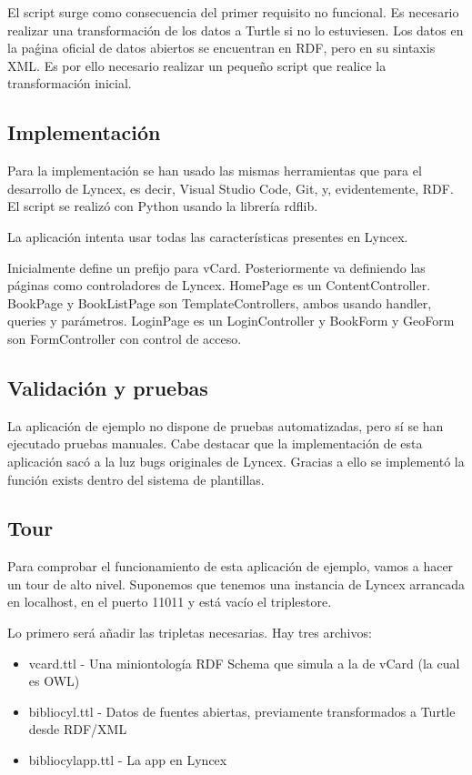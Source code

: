 \documentclass[12pt]{report} %
\begin{document}
El script surge como consecuencia del primer requisito no funcional. Es necesario realizar una transformación de los datos a Turtle si no lo estuviesen. Los datos en la paǵina oficial de datos abiertos se encuentran en RDF, pero en su sintaxis XML. Es por ello necesario realizar un pequeño script que realice la transformación inicial.


\subsection{Implementación}

Para la implementación se han usado las mismas herramientas que para el desarrollo de Lyncex, es decir, Visual Studio Code, Git, y, evidentemente, RDF. El script se realizó con Python usando la librería rdflib.

La aplicación intenta usar todas las características presentes en Lyncex. 

Inicialmente define un prefijo para vCard. Posteriormente va definiendo las páginas como controladores de Lyncex. HomePage es un ContentController. BookPage y BookListPage son TemplateControllers, ambos usando handler, queries y parámetros. LoginPage es un LoginController y BookForm y GeoForm son FormController con control de acceso.

\subsection{Validación y pruebas} 

La aplicación de ejemplo no dispone de pruebas automatizadas, pero sí se han ejecutado pruebas manuales. Cabe destacar que la implementación de esta aplicación sacó a la luz bugs originales de Lyncex. Gracias a ello se implementó la función exists dentro del sistema de plantillas.

\subsection{Tour}

Para comprobar el funcionamiento de esta aplicación de ejemplo, vamos a hacer un tour de alto nivel. Suponemos que tenemos una instancia de Lyncex arrancada en localhost, en el puerto 11011 y está vacío el triplestore.

Lo primero será añadir las tripletas necesarias. Hay tres archivos:
\begin{itemize}
    \item vcard.ttl - Una miniontología RDF Schema que simula a la de vCard (la cual es OWL)
    \item bibliocyl.ttl - Datos de fuentes abiertas, previamente transformados a Turtle desde RDF/XML
    \item bibliocylapp.ttl - La app en Lyncex
\end{itemize}
\end{document}
